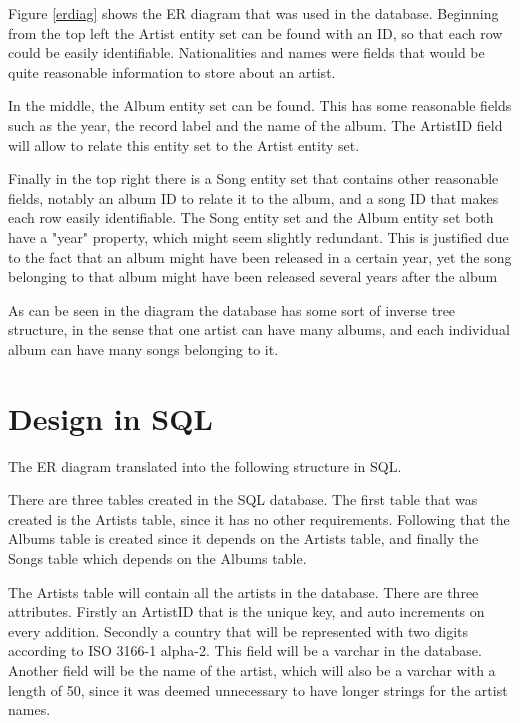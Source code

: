 \documentclass[a4paper,12pt]{article}
\begin{document}
Figure \ref{erdiag} shows the ER diagram that was used in the database. Beginning from the top left the Artist entity set can be found with an ID, so that each row could be easily identifiable. Nationalities and names were fields that would be quite reasonable information to store about an artist.

In the middle, the Album entity set can be found. This has some reasonable fields such as the year, the record label and the name of the album. The ArtistID field will allow to relate this entity set to the Artist entity set. 

Finally in the top right there is a Song entity set  that contains other reasonable fields, notably an album ID to relate it to the album, and a song ID that makes each row easily identifiable.
The Song entity set and the Album entity set both have a "year" property, which might seem slightly redundant. This is justified due to the fact that an album might have been released in a certain year, yet the song belonging to that album might have been released several years after the album

As can be seen in the diagram the database has some sort of inverse tree structure, in the sense that one artist can have many albums, and each individual album can have many songs belonging to it.


\clearpage
\section{Design in SQL}
The ER diagram translated into the following structure in SQL.

There are three tables created in the SQL database. The first table that was created is the Artists table, since it has no other requirements. Following that the Albums table is created since it depends on the Artists table, and finally the Songs table which depends on the Albums table.

The Artists table will contain all the artists in the database. There are three attributes. Firstly an ArtistID that is the unique key, and auto increments on every addition. Secondly a country that will be represented with two digits according to ISO 3166-1 alpha-2. This field will be a varchar in the database. Another field will be the name of the artist, which will also be a varchar with a length of 50, since it was deemed unnecessary to have longer strings for the artist names.
\end{document}
